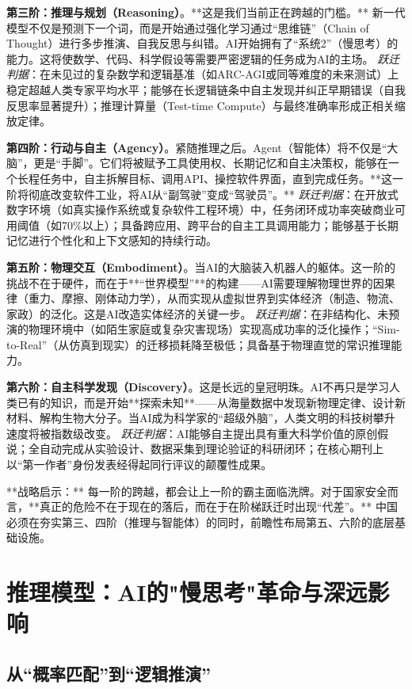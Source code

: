 		\textbf{第三阶：推理与规划（Reasoning）}。**这是我们当前正在跨越的门槛。** 新一代模型不仅是预测下一个词，而是开始通过强化学习通过“思维链”（Chain of Thought）进行多步推演、自我反思与纠错。AI开始拥有了“系统2”（慢思考）的能力。这将使数学、代码、科学假设等需要严密逻辑的任务成为AI的主场。
		\textit{跃迁判据}：在未见过的复杂数学和逻辑基准（如ARC-AGI或同等难度的未来测试）上稳定超越人类专家平均水平；能够在长逻辑链条中自主发现并纠正早期错误（自我反思率显著提升）；推理计算量（Test-time Compute）与最终准确率形成正相关缩放定律。

		\textbf{第四阶：行动与自主（Agency）}。紧随推理之后。Agent（智能体）将不仅是“大脑”，更是“手脚”。它们将被赋予工具使用权、长期记忆和自主决策权，能够在一个长程任务中，自主拆解目标、调用API、操控软件界面，直到完成任务。**这一阶将彻底改变软件工业，将AI从“副驾驶”变成“驾驶员”。**
		\textit{跃迁判据}：在开放式数字环境（如真实操作系统或复杂软件工程环境）中，任务闭环成功率突破商业可用阈值（如70\%以上）；具备跨应用、跨平台的自主工具调用能力；能够基于长期记忆进行个性化和上下文感知的持续行动。

		\textbf{第五阶：物理交互（Embodiment）}。当AI的大脑装入机器人的躯体。这一阶的挑战不在于硬件，而在于**“世界模型”**的构建——AI需要理解物理世界的因果律（重力、摩擦、刚体动力学），从而实现从虚拟世界到实体经济（制造、物流、家政）的泛化。这是AI改造实体经济的关键一步。
		\textit{跃迁判据}：在非结构化、未预演的物理环境中（如陌生家庭或复杂灾害现场）实现高成功率的泛化操作；“Sim-to-Real”（从仿真到现实）的迁移损耗降至极低；具备基于物理直觉的常识推理能力。

		\textbf{第六阶：自主科学发现（Discovery）}。这是长远的皇冠明珠。AI不再只是学习人类已有的知识，而是开始**探索未知**——从海量数据中发现新物理定律、设计新材料、解构生物大分子。当AI成为科学家的“超级外脑”，人类文明的科技树攀升速度将被指数级改变。
		\textit{跃迁判据}：AI能够自主提出具有重大科学价值的原创假说；全自动完成从实验设计、数据采集到理论验证的科研闭环；在核心期刊上以“第一作者”身份发表经得起同行评议的颠覆性成果。

**战略启示：** 每一阶的跨越，都会让上一阶的霸主面临洗牌。对于国家安全而言，**真正的危险不在于现在的落后，而在于在阶梯跃迁时出现“代差”。** 中国必须在夯实第三、四阶（推理与智能体）的同时，前瞻性布局第五、六阶的底层基础设施。

\section{推理模型：AI的"慢思考"革命与深远影响}

\subsection{从“概率匹配”到“逻辑推演”}


